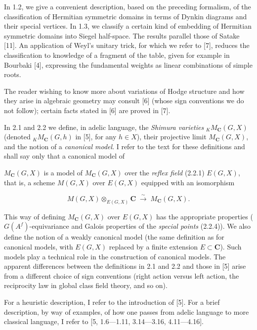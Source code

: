 \documentclass[10pt,a4paper]{article}
\newcommand{\SourcePage}[2]{\clearpage\setcounter{page}{#2}\typeout{D031_SOURCE_PAGE physical=#1 printed=#2}}
\begin{document}
In 1.2, we give a convenient description, based on the preceding formalism, of the classification of Hermitian symmetric domains in terms of Dynkin diagrams and their special vertices. In 1.3, we classify a certain kind of embedding of Hermitian symmetric domains into Siegel half-space. The results parallel those of Satake {[}11{]}. An application of Weyl's unitary trick, for which we refer to {[}7{]}, reduces the classification to knowledge of a fragment of the table, given for example in Bourbaki {[}4{]}, expressing the fundamental weights as linear combinations of simple roots.

The reader wishing to know more about variations of Hodge structure and how they arise in algebraic geometry may consult {[}6{]} (whose sign conventions we do not follow); certain facts stated in {[}6{]} are proved in {[}7{]}.

In 2.1 and 2.2 we define, in adelic language, the \emph{Shimura varieties} \({}_K M_{\mathbf C}(G,X)\) (denoted \({}_K M_{\mathbf C}(G,h)\) in {[}5{]}, for any \(h\in X\)), their projective limit \(M_{\mathbf C}(G,X)\), and the notion of a \emph{canonical model}. I refer to the text for these definitions and shall say only that a canonical model of

\SourcePage{3}{249}
\(M_{\mathbf C}(G,X)\) is a model of \(M_{\mathbf C}(G,X)\) over the \emph{reflex field} (2.2.1) \(E(G,X)\), that is, a scheme \(M(G,X)\) over \(E(G,X)\) equipped with an isomorphism

\[
M(G,X)\otimes_{E(G,X)}\mathbf C\;\xrightarrow{\sim}\;M_{\mathbf C}(G,X).
\]

This way of defining \(M_{\mathbf C}(G,X)\) over \(E(G,X)\) has the appropriate properties (\(G(A^f)\)-equivariance and Galois properties of the \emph{special points} (2.2.4)). We also define the notion of a weakly canonical model (the same definition as for canonical models, with \(E(G,X)\) replaced by a finite extension \(E\subset\mathbf C\)). Such models play a technical role in the construction of canonical models. The apparent differences between the definitions in 2.1 and 2.2 and those in {[}5{]} arise from a different choice of sign conventions (right action versus left action, the reciprocity law in global class field theory, and so on).

For a heuristic description, I refer to the introduction of {[}5{]}. For a brief description, by way of examples, of how one passes from adelic language to more classical language, I refer to {[}5, 1.6---1.11, 3.14---3.16, 4.11---4.16{]}.
\end{document}
